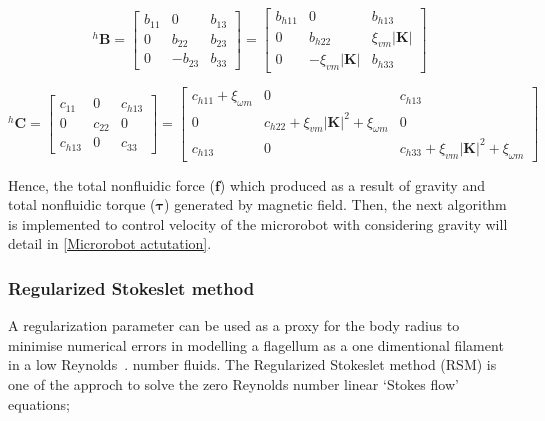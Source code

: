 \documentclass[12pt,a4paper,titlepage]{report}
\begin{document}
\begin{equation}
 ^{h}\bm{B} = \begin{bmatrix}
       b_{11}  & 0 		 & b_{13}        \\[0.3em]
       0		 & b_{22}           & b_{23}\\[0.3em]
       0           	& -b_{23}		& b_{33}
     \end{bmatrix}
	=
	  \begin{bmatrix}
       b_{h11}  & 0 		 & b_{h13}          \\[0.3em]
       0		 & b_{h22}           & \xi_{vm}|\bm{K}|       \\[0.3em]
       0           	& - \xi_{vm}|\bm{K}| 		& b_{h33}
     \end{bmatrix}
\label{B_finalmatrix}
\end{equation}




\begin{equation}
 ^{h}\bm{C} = \begin{bmatrix}
       c_{11}  & 0 		 & c_{h13}            \\[0.3em]
       0		 & c_{22}           & 0\\[0.3em]
       c_{h13}            	& 0 		& c_{33} 
     \end{bmatrix}
	=
	 \begin{bmatrix}
       c_{h11}+ \xi_{\omega m} & 0 		 & c_{h13}            \\[0.3em]
       0		 & c_{h22}+  \xi_{vm}|\bm{K}|^2 +\xi_{\omega m}          & 0\\[0.3em]
       c_{h13}            	& 0 		& c_{h33} + \xi_{vm}|\bm{K}|^2 +\xi_{\omega m}
     \end{bmatrix}
\label{C_Finalmatrix}
\end{equation}

Hence, the total nonfluidic force ($\bm{f}$) which produced as a result of gravity and total nonfluidic torque
($\bm{\tau}$) generated by magnetic field. Then, the next algorithm is implemented  to control velocity of the
microrobot with considering gravity will detail in \ref{Microrobot actutation}.





\subsubsection{Regularized Stokeslet method}\label{method2}

A regularization parameter can be used as a proxy for the body radius to minimise numerical errors
 in modelling a flagellum as a one dimentional filament in a low Reynolds~\citep{smith2009boundary}.
number fluids. The Regularized Stokeslet method (RSM) is one of the approch to solve the zero 
Reynolds number linear \lq{}Stokes flow\rq{} equations;
\end{document}

